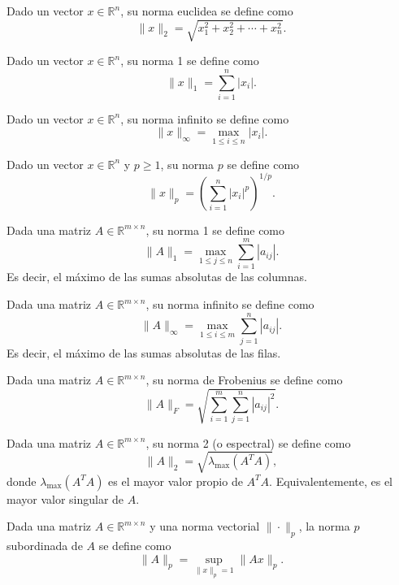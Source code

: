 
\begin{definición}
    Dado un vector $x \in \mathbb{R}^n$, su norma euclidea se define como
    \[
        \|x\|_2 = \sqrt{x_1^2 + x_2^2 + \cdots + x_n^2}.
    \] 
\end{definición}

\begin{definición}
    Dado un vector $x \in \mathbb{R}^n$, su norma 1 se define como
    \[
        \|x\|_1 = \sum_{i=1}^n |x_i|.
    \]
\end{definición}

\begin{definición}
    Dado un vector $x \in \mathbb{R}^n$, su norma infinito se define como
    \[
        \|x\|_\infty = \max_{1 \le i \le n} |x_i|.
    \]
\end{definición}

\begin{definición}
    Dado un vector $x \in \mathbb{R}^n$ y $p \ge 1$, su norma $p$ se define como
    \[
        \|x\|_p = \left( \sum_{i=1}^n |x_i|^p \right)^{1/p}.
    \]
\end{definición}

\begin{definición}
    Dada una matriz $A \in \mathbb{R}^{m \times n}$, su norma 1 se define como
    \[
        \|A\|_1 = \max_{1 \le j \le n} \sum_{i=1}^m |a_{ij}|.
    \]
    Es decir, el máximo de las sumas absolutas de las columnas.
\end{definición}

\begin{definición}
    Dada una matriz $A \in \mathbb{R}^{m \times n}$, su norma infinito se define como
    \[
        \|A\|_\infty = \max_{1 \le i \le m} \sum_{j=1}^n |a_{ij}|.
    \]
    Es decir, el máximo de las sumas absolutas de las filas.
\end{definición}

\begin{definición}
    Dada una matriz $A \in \mathbb{R}^{m \times n}$, su norma de Frobenius se define como
    \[
        \|A\|_F = \sqrt{\sum_{i=1}^m \sum_{j=1}^n |a_{ij}|^2}.
    \]
\end{definición}

\begin{definición}
    Dada una matriz $A \in \mathbb{R}^{m \times n}$, su norma 2 (o espectral) se define como
    \[
        \|A\|_2 = \sqrt{\lambda_{\max}(A^T A)},
    \]
    donde $\lambda_{\max}(A^T A)$ es el mayor valor propio de $A^T A$. Equivalentemente, es el mayor valor singular de $A$.
\end{definición}

\begin{definición}
    Dada una matriz $A \in \mathbb{R}^{m \times n}$ y una norma vectorial $\|\cdot\|_p$, la norma $p$ subordinada de $A$ se define como
    \[
        \|A\|_p = \sup_{\|x\|_p = 1} \|Ax\|_p.
    \]
\end{definición}